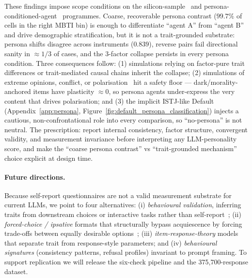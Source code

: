 \documentclass{article}
\begin{document}
These findings impose scope conditions on the silicon-sample~\citep{argyle2023one,horton2023homo,ferreira2025matching} and persona-conditioned-agent~\citep{chuang2023simulating,cau2025language,chuang2025debate,park2023generative} programmes. Coarse, recoverable persona contrast ($99.7\%$ of cells in the right MBTI bin) is enough to differentiate ``agent A'' from ``agent B'' and drive demographic stratification, but it is not a trait-grounded substrate: persona shifts disagree across instruments ($0.839$), reverse pairs fail directional sanity in ${\approx}1/3$ of cases, and the 3-factor collapse persists in every persona condition. Three consequences follow: (1) simulations relying on factor-pure trait differences or trait-mediated causal chains inherit the collapse; (2) simulations of extreme opinions, conflict, or polarisation~\citep{chuang2025debate,cau2025language} hit a safety floor --- dark/morality-anchored items have plasticity ${\approx}0$, so persona agents under-express the very content that drives polarisation; and (3) the implicit ISTJ-like Default (Appendix~\ref{app:persona}, Figure~\ref{fig:default_persona_classification}) injects a cautious, non-confrontational role into every comparison, so ``no-persona'' is not neutral. The prescription: report internal consistency, factor structure, convergent validity, and measurement invariance before interpreting any LLM-personality score, and make the ``coarse persona contrast'' vs ``trait-grounded mechanism'' choice explicit at design time.

\paragraph{Future directions.} Because self-report questionnaires are not a valid measurement substrate for current LLMs, we point to four alternatives: (i) \emph{behavioural validation}, inferring traits from downstream choices or interactive tasks rather than self-report~\citep{han2025personality,mannekote2025roleplaying}; (ii) \emph{forced-choice / ipsative} formats that structurally bypass acquiescence by forcing trade-offs between equally desirable options~\citep{brown2011forcedchoice,treaux2025forced}; (iii) \emph{item-response-theory} models that separate trait from response-style parameters; and (iv) \emph{behavioural signatures} (consistency patterns, refusal profiles) invariant to prompt framing. To support replication we will release the six-check pipeline and the 375{,}700-response dataset.

\end{document}
